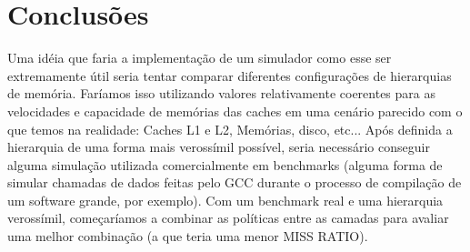 \documentclass[12pt]{article}
\begin{document}
\section{Conclusões}
\label{conclusao}

Uma idéia que faria a implementação de um simulador como esse ser extremamente útil seria tentar comparar diferentes configurações de hierarquias de memória. Faríamos isso utilizando valores relativamente coerentes para as velocidades e capacidade de memórias das caches em uma cenário parecido com o que temos na realidade: Caches L1 e L2, Memórias, disco, etc... Após definida a hierarquia de uma forma mais verossímil possível, seria necessário conseguir alguma simulação utilizada comercialmente em benchmarks (alguma forma de simular chamadas de dados feitas pelo GCC durante o processo de compilação de um software grande, por exemplo). Com um benchmark real e uma hierarquia verossímil, começaríamos a combinar as políticas entre as camadas para avaliar uma melhor combinação (a que teria uma menor MISS RATIO).
\end{document}
